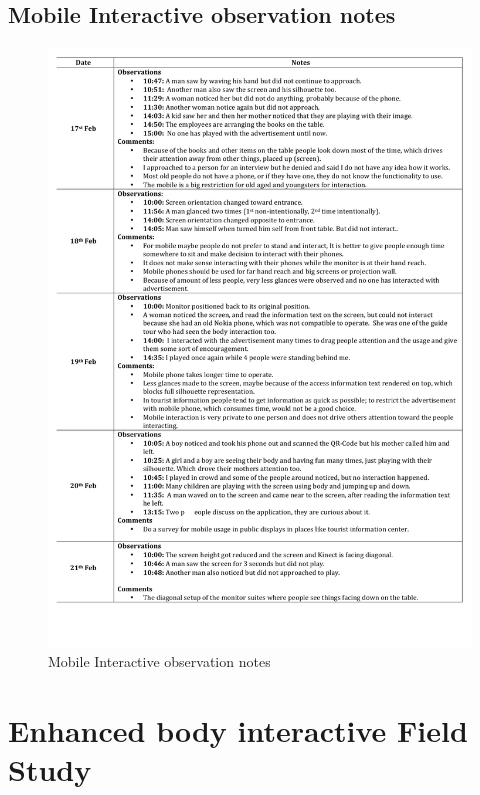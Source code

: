 \begin{appendices}
\section{Mobile Interactive observation notes}
\begin{figure}[H]
 \centering 
    \includegraphics[width=\textwidth,height=0.8\textheight]{Appendices/8/mobile-interactive/notetaking.pdf}
    \caption{Mobile Interactive observation notes}
     \label{app:MobileInteractiveobservation-notes}%
\end{figure}



\chapter{Enhanced body interactive Field Study}
\setcounter{figure}{0}
\setcounter{table}{0}
    

\end{appendices}
